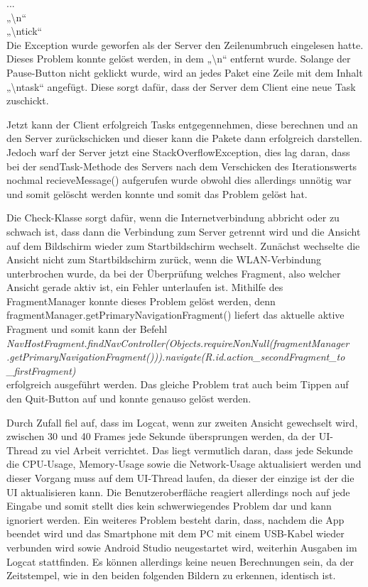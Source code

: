 \documentclass[12pt, onecolumn,notitlepage]{scrartcl}
\begin{document}
... \\
„\textbackslash n“ \\
„\textbackslash ntick“ \\
Die Exception wurde geworfen als der Server den Zeilenumbruch eingelesen hatte. Dieses Problem konnte gelöst werden, in dem „\textbackslash n“ entfernt wurde. Solange der Pause-Button nicht geklickt wurde, wird an jedes Paket eine Zeile mit dem Inhalt „\textbackslash ntask“ angefügt. Diese sorgt dafür, dass der Server dem Client eine neue Task zuschickt. \par
Jetzt kann der Client erfolgreich Tasks entgegennehmen, diese berechnen und an den Server zurückschicken und dieser kann die Pakete dann erfolgreich darstellen. Jedoch warf der Server jetzt eine StackOverflowException, dies lag daran, dass bei der sendTask-Methode des Servers nach dem Verschicken des Iterationswerts nochmal recieveMessage() aufgerufen wurde obwohl dies allerdings unnötig war und somit gelöscht werden konnte und somit das Problem gelöst hat. \par
Die Check-Klasse sorgt dafür, wenn die Internetverbindung abbricht oder zu schwach ist, dass dann die Verbindung zum Server getrennt wird und die Ansicht auf dem Bildschirm wieder zum Startbildschirm wechselt. Zunächst wechselte die Ansicht nicht zum Startbildschirm zurück, wenn die WLAN-Verbindung unterbrochen wurde, da bei der Überprüfung welches Fragment, also welcher Ansicht gerade aktiv ist, ein Fehler unterlaufen ist. Mithilfe des FragmentManager konnte dieses Problem gelöst werden, denn fragmentManager.getPrimaryNavigationFragment() liefert das aktuelle aktive Fragment und somit kann der Befehl \\
\textit{NavHostFragment.findNavController(Objects.requireNonNull(fragmentManager\\.getPrimaryNavigationFragment())).navigate(R.id.action\_secondFragment\_to\\\_firstFragment)} \\
erfolgreich ausgeführt werden. Das gleiche Problem trat auch beim Tippen auf den Quit-Button auf und konnte genauso gelöst werden. \par
Durch Zufall fiel auf, dass im Logcat, wenn zur zweiten Ansicht gewechselt wird, zwischen 30 und 40 Frames jede Sekunde übersprungen werden, da der UI-Thread zu viel Arbeit verrichtet. Das liegt vermutlich daran, dass jede Sekunde die CPU-Usage, Memory-Usage sowie die Network-Usage aktualisiert werden und dieser Vorgang muss auf dem UI-Thread laufen, da dieser der einzige ist der die UI aktualisieren kann. Die Benutzeroberfläche reagiert allerdings noch auf jede Eingabe und somit stellt dies kein schwerwiegendes Problem dar und kann ignoriert werden.
Ein weiteres Problem besteht darin, dass, nachdem die App beendet wird und das Smartphone mit dem PC mit einem USB-Kabel wieder verbunden wird sowie Android Studio neugestartet wird, weiterhin Ausgaben im Logcat stattfinden. Es können allerdings keine neuen Berechnungen sein, da der Zeitstempel, wie in den beiden folgenden Bildern zu erkennen, identisch ist.
\end{document}
